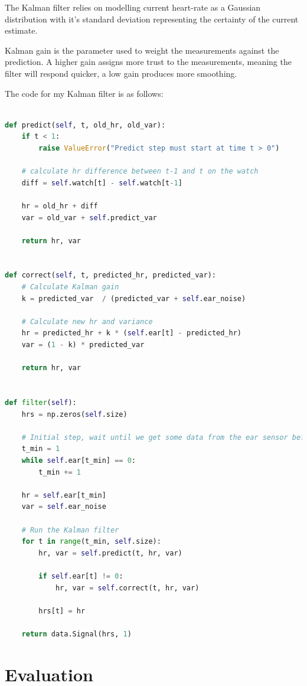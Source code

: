 \documentclass[12pt,a4paper,twoside,openright]{report}
\begin{document}
The Kalman filter relies on modelling current heart-rate as a Gaussian
distribution with it's standard deviation representing the certainty of the
current estimate.

Kalman gain is the parameter used to weight the measurements against the
prediction. A higher gain assigns more trust to the measurements, meaning the
filter will respond quicker, a low gain produces more smoothing.

The code for my Kalman filter is as follows:


\begin{lstlisting}[language=Python]

def predict(self, t, old_hr, old_var):
    if t < 1:
        raise ValueError("Predict step must start at time t > 0")

    # calculate hr difference between t-1 and t on the watch
    diff = self.watch[t] - self.watch[t-1]

    hr = old_hr + diff
    var = old_var + self.predict_var

    return hr, var


def correct(self, t, predicted_hr, predicted_var):
    # Calculate Kalman gain
    k = predicted_var  / (predicted_var + self.ear_noise)

    # Calculate new hr and variance
    hr = predicted_hr + k * (self.ear[t] - predicted_hr)
    var = (1 - k) * predicted_var

    return hr, var


def filter(self):
    hrs = np.zeros(self.size)

    # Initial step, wait until we get some data from the ear sensor before starting the filter
    t_min = 1
    while self.ear[t_min] == 0:
        t_min += 1

    hr = self.ear[t_min]
    var = self.ear_noise

    # Run the Kalman filter
    for t in range(t_min, self.size):
        hr, var = self.predict(t, hr, var)

        if self.ear[t] != 0:
            hr, var = self.correct(t, hr, var)

        hrs[t] = hr

    return data.Signal(hrs, 1)

\end{lstlisting}

\chapter{Evaluation}
\end{document}
